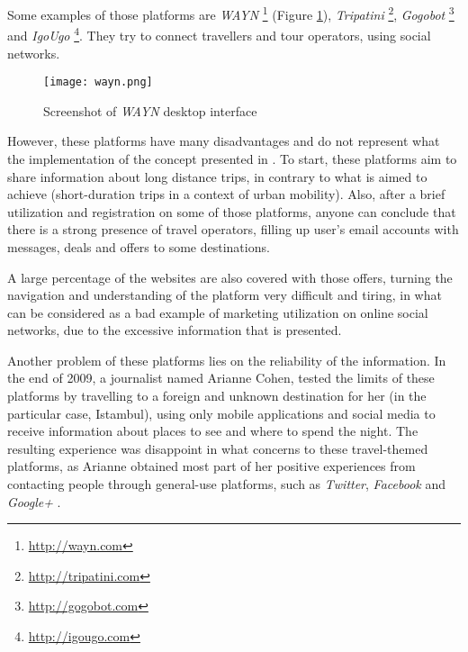 Some examples of those platforms are \emph{WAYN} \footnote{\url{http://wayn.com}} (Figure \ref{fig:wayn}), \emph{Tripatini} \footnote{\url{http://tripatini.com}}, \emph{Gogobot} \footnote{\url{http://gogobot.com}} and \emph{IgoUgo} \footnote{\url{http://igougo.com}}. They try to connect travellers and tour operators, using social networks.

\begin{figure}[h!]
  \begin{center}
    \leavevmode
    \texttt{[image: wayn.png]}
    \caption{Screenshot of \emph{WAYN} desktop interface}
    \label{fig:wayn}
  \end{center}
\end{figure}

However, these platforms have many disadvantages and do not represent what the implementation of the concept presented in \cite{kn:NGeCP11}. To start, these platforms aim to share information about long distance trips, in contrary to what is aimed to achieve (short-duration trips in a context of urban mobility).
Also, after a brief utilization and registration on some of those platforms, anyone can conclude that there is a strong presence of travel operators, filling up user's email accounts with messages, deals and offers to some destinations. 

A large percentage of the websites are also covered with those offers, turning the navigation and understanding of the platform very difficult and tiring, in what can be considered as a bad example of marketing utilization on online social networks, due to the excessive information that is presented.

Another problem of these platforms lies on the reliability of the information. In the end of 2009, a journalist named Arianne Cohen, tested the limits of these platforms by travelling to a foreign and unknown destination for her (in the particular case, Istambul), using only mobile applications and social media to receive information about places to see and where to spend the night. The resulting experience was disappoint in what concerns to these travel-themed platforms, as Arianne obtained most part of her positive experiences from contacting people through general-use platforms, such as \emph{Twitter}, \emph{Facebook} and \emph{Google+} \cite{kn:Coh10}.


